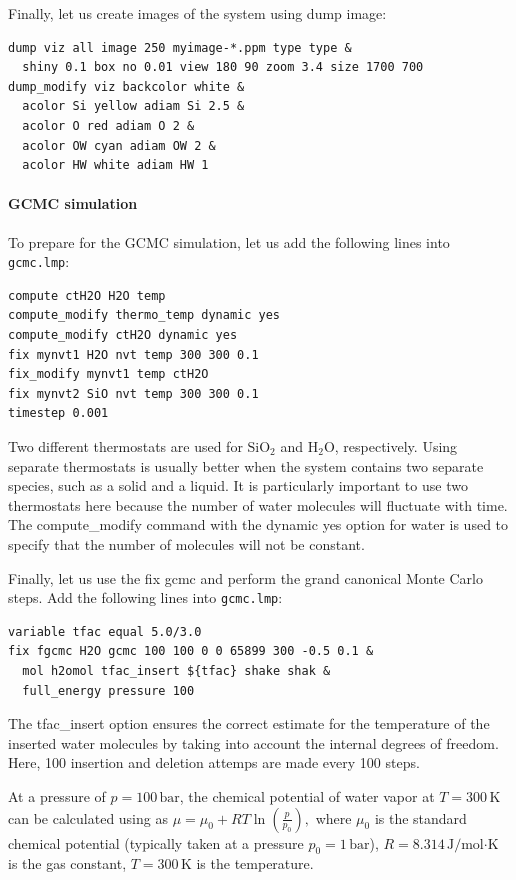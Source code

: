 \documentclass[9pt,tutorial]{livecoms}
\newcommand{\lmpcmd}[1]{\hspace{0pt}\colorbox{listing}{\textcolor{command}{\small{#1}}}\hspace{0pt}} %
\newcommand{\flecmd}[1]{\textcolor{command}{\texttt{#1}}} %
\begin{document}
Finally, let us create images
of the system using \lmpcmd{dump image}:
\begin{lstlisting}
dump viz all image 250 myimage-*.ppm type type &
  shiny 0.1 box no 0.01 view 180 90 zoom 3.4 size 1700 700
dump_modify viz backcolor white &
  acolor Si yellow adiam Si 2.5 &
  acolor O red adiam O 2 &
  acolor OW cyan adiam OW 2 &
  acolor HW white adiam HW 1
\end{lstlisting}

\paragraph{GCMC simulation}

To prepare for the GCMC simulation, let us add the
following lines into \flecmd{gcmc.lmp}:
\begin{lstlisting}
compute ctH2O H2O temp
compute_modify thermo_temp dynamic yes
compute_modify ctH2O dynamic yes
fix mynvt1 H2O nvt temp 300 300 0.1
fix_modify mynvt1 temp ctH2O
fix mynvt2 SiO nvt temp 300 300 0.1
timestep 0.001
\end{lstlisting}
Two different thermostats are used for $\text{SiO}_2$ and $\text{H}_2\text{O}$,
respectively.  Using separate thermostats is usually better when the system contains
two separate species, such as a solid and a liquid.  It is particularly important
to use two thermostats here because the number of water molecules will fluctuate
with time.  The \lmpcmd{compute\_modify} command with the \lmpcmd{dynamic yes}
option for water is used to specify that the number of molecules will not be constant.

Finally, let us use the \lmpcmd{fix gcmc} and perform the grand canonical Monte
Carlo steps.  Add the following lines into \flecmd{gcmc.lmp}:
\begin{lstlisting}
variable tfac equal 5.0/3.0
fix fgcmc H2O gcmc 100 100 0 0 65899 300 -0.5 0.1 &
  mol h2omol tfac_insert ${tfac} shake shak &
  full_energy pressure 100
\end{lstlisting}
The \lmpcmd{tfac\_insert} option ensures the correct estimate for the temperature
of the inserted water molecules by taking into account the internal degrees of
freedom.  Here, 100 insertion and deletion attemps are made every 100 steps.

\begin{note}
At a pressure of $p = 100\,\text{bar}$, the chemical potential of water vapor at $T = 300\,\text{K}$
can be calculated using as $\mu = \mu_0 + RT \ln (\frac{p}{p_0}),$ where $\mu_0$ is the standard
chemical potential (typically taken at a pressure $p_0 = 1 \, \text{bar}$), $R = 8.314\, \text{J/mol·K}$
is the gas constant, $T = 300\,\text{K}$ is the temperature.
\end{note}
\end{document}
